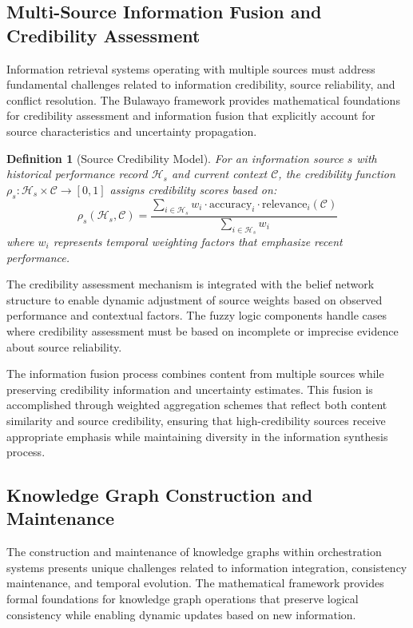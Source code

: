 \documentclass[12pt,a4paper]{article}
\newtheorem{definition}[theorem]{Definition}
\begin{document}
{{{\subsection{Multi-Source Information Fusion and Credibility Assessment}

Information retrieval systems operating with multiple sources must address fundamental challenges related to information credibility, source reliability, and conflict resolution. The Bulawayo framework provides mathematical foundations for credibility assessment and information fusion that explicitly account for source characteristics and uncertainty propagation.

\begin{definition}[Source Credibility Model]
For an information source $s$ with historical performance record $\mathcal{H}_s$ and current context $\mathcal{C}$, the credibility function $\rho_s : \mathcal{H}_s \times \mathcal{C} \rightarrow [0,1]$ assigns credibility scores based on:
\begin{equation}
\rho_s(\mathcal{H}_s, \mathcal{C}) = \frac{\sum_{i \in \mathcal{H}_s} w_i \cdot \text{accuracy}_i \cdot \text{relevance}_i(\mathcal{C})}{\sum_{i \in \mathcal{H}_s} w_i}
\end{equation}
where $w_i$ represents temporal weighting factors that emphasize recent performance.
\end{definition}

The credibility assessment mechanism is integrated with the belief network structure to enable dynamic adjustment of source weights based on observed performance and contextual factors. The fuzzy logic components handle cases where credibility assessment must be based on incomplete or imprecise evidence about source reliability.

The information fusion process combines content from multiple sources while preserving credibility information and uncertainty estimates. This fusion is accomplished through weighted aggregation schemes that reflect both content similarity and source credibility, ensuring that high-credibility sources receive appropriate emphasis while maintaining diversity in the information synthesis process.

\subsection{Knowledge Graph Construction and Maintenance}

The construction and maintenance of knowledge graphs within orchestration systems presents unique challenges related to information integration, consistency maintenance, and temporal evolution. The mathematical framework provides formal foundations for knowledge graph operations that preserve logical consistency while enabling dynamic updates based on new information.

}}}
\end{document}
